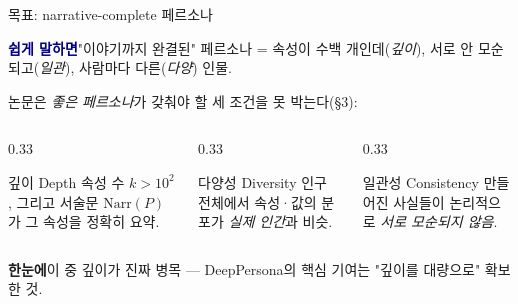 \documentclass[aspectratio=169,10pt]{beamer}   %
\newcommand{\lead}[1]{%
  \vspace*{0.6em}%
  {\setlength{\fboxsep}{9pt}%
   \noindent\colorbox{accent!12}{\parbox{\dimexpr\textwidth-2\fboxsep\relax}{%
     \textcolor{accent}{\textbf{한눈에}}\hspace{0.6em}#1}}}\par\vspace{1.15em}}
\newcommand{\intu}[1]{%
  \vspace*{0.2em}%
  {\setlength{\fboxsep}{7pt}%
   \noindent\colorbox{navy!8}{\parbox{\dimexpr\textwidth-2\fboxsep\relax}{%
     \textcolor{navy}{\textbf{쉽게 말하면}}\hspace{0.6em}#1}}}\par\vspace{0.5em}}
\begin{document}
\begin{frame}{목표: \alert{narrative-complete} 페르소나}
  \intu{"이야기까지 완결된" 페르소나 = 속성이 수백 개인데(\emph{깊이}), 서로 안 모순되고(\emph{일관}), 사람마다 다른(\emph{다양}) 인물.}
  논문은 \emph{좋은 페르소나}가 갖춰야 할 세 조건을 못 박는다(\S3):
  \begin{columns}[T]
    \begin{column}{0.33\textwidth}
      \begin{block}{깊이 Depth}
        속성 수 $k>10^2$, 그리고 서술문 $\mathrm{Narr}(P)$가 그 속성을 정확히 요약.
      \end{block}
    \end{column}
    \begin{column}{0.33\textwidth}
      \begin{block}{다양성 Diversity}
        인구 전체에서 속성·값의 분포가 \emph{실제 인간}과 비슷.
      \end{block}
    \end{column}
    \begin{column}{0.33\textwidth}
      \begin{block}{일관성 Consistency}
        만들어진 사실들이 논리적으로 \emph{서로 모순되지 않음}.
      \end{block}
    \end{column}
  \end{columns}
  \smallskip
  \lead{이 중 \alert{깊이}가 진짜 병목 — DeepPersona의 핵심 기여는 "깊이를 대량으로" 확보한 것.}
\end{frame}

\end{document}
